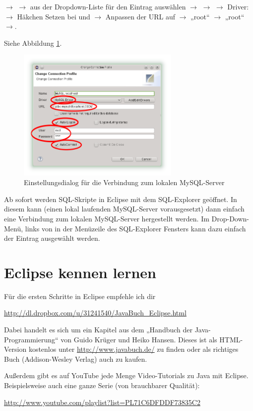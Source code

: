 $\rightarrow$  $\rightarrow$ aus der
Dropdown-Liste für  den Eintrag
 auswählen $\rightarrow$ 
$\rightarrow$  $\rightarrow$ Driver: 
$\rightarrow$ Häkchen Setzen bei  und 
$\rightarrow$ Anpassen der URL auf 
$\rightarrow$  „root“ $\rightarrow$  „root“
$\rightarrow$.

Siehe Abbildung \ref{fig:sql-explorer-connection-profile}.

\begin{figure}[h]
  \centering
   \includegraphics[width=0.7\textwidth]{./inf/SEKII/01_Vorbereitung/SQL-Explorer_Connection-Profile.png}
   \caption{Einstellungsdialog für die Verbindung zum lokalen MySQL-Server}
   \label{fig:sql-explorer-connection-profile}
\end{figure}

Ab sofort werden SQL-Skripte in Eclipse mit dem SQL-Explorer geöffnet. In diesem
kann (einen lokal laufenden MySQL-Server vorausgesetzt)  dann einfach eine
Verbindung zum lokalen MySQL-Server hergestellt werden. Im Drop-Down-Menü,
links von  in der Menüzeile des SQL-Explorer Fensters kann
dazu einfach der Eintrag  ausgewählt werden.



\section{Eclipse kennen lernen}

Für die ersten Schritte in Eclipse empfehle ich dir

\url{http://dl.dropbox.com/u/31241540/JavaBuch_Eclipse.html} 

Dabei handelt es sich um ein Kapitel aus dem „Handbuch der Java-Programmierung“
von Guido Krüger und Heiko Hansen. Dieses ist als HTML-Version kostenlos unter
\url{http://www.javabuch.de/} zu finden oder als richtiges Buch (Addison-Wesley
Verlag) auch zu kaufen.

\begin{minipage}{\textwidth}
Außerdem gibt es auf YouTube jede Menge Video-Tutorials zu Java mit Eclipse.
Beispielsweise auch eine ganze Serie (von brauchbarer Qualität):

\url{http://www.youtube.com/playlist?list=PL71C6DFDDF73835C2}
\end{minipage}
